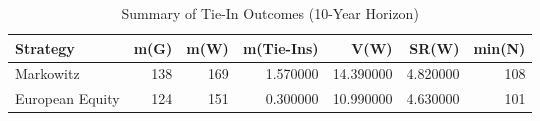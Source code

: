 \begin{table}
\caption{Summary of Tie-In Outcomes (10-Year Horizon)}
\label{tab:tie_in_summary}
\begin{tabular}{lrrrrrr}
\toprule
Strategy & m(G) & m(W) & m(Tie-Ins) & V(W) & SR(W) & min(N) \\
\midrule
Markowitz & 138 & 169 & 1.570000 & 14.390000 & 4.820000 & 108 \\
European Equity & 124 & 151 & 0.300000 & 10.990000 & 4.630000 & 101 \\
\bottomrule
\end{tabular}
\end{table}
